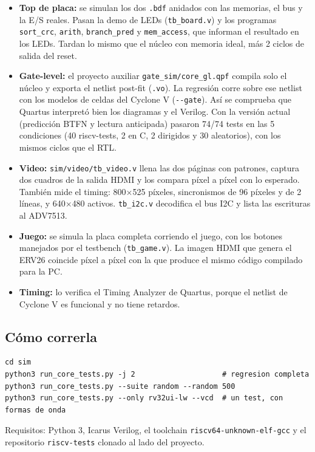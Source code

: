 \documentclass[11pt,a4paper]{article}
\newcommand{\code}[1]{\texttt{#1}}
\begin{document}
\begin{itemize}
\item \textbf{Top de placa:} se simulan los dos \code{.bdf} anidados con las memorias, el bus y la E/S reales. Pasan la demo de LEDs (\code{tb\_board.v}) y los programas \code{sort\_crc}, \code{arith}, \code{branch\_pred} y \code{mem\_access}, que informan el resultado en los LEDs. Tardan lo mismo que el núcleo con memoria ideal, más 2 ciclos de salida del reset.
\item \textbf{Gate-level:} el proyecto auxiliar \code{gate\_sim/core\_gl.qpf} compila solo el núcleo y exporta el netlist post-fit (\code{.vo}). La regresión corre sobre ese netlist con los modelos de celdas del Cyclone V (\lstinline{--gate}). Así se comprueba que Quartus interpretó bien los diagramas y el Verilog. Con la versión actual (predicción BTFN y lectura anticipada) pasaron 74/74 tests en las 5 condiciones (40 riscv-tests, 2 en C, 2 dirigidos y 30 aleatorios), con los mismos ciclos que el RTL.
\item \textbf{Video:} \code{sim/video/tb\_video.v} llena las dos páginas con patrones, captura dos cuadros de la salida HDMI y los compara píxel a píxel con lo esperado. También mide el timing: 800$\times$525 píxeles, sincronismos de 96 píxeles y de 2 líneas, y 640$\times$480 activos. \code{tb\_i2c.v} decodifica el bus I2C y lista las escrituras al ADV7513.
\item \textbf{Juego:} se simula la placa completa corriendo el juego, con los botones manejados por el testbench (\code{tb\_game.v}). La imagen HDMI que genera el ERV26 coincide píxel a píxel con la que produce el mismo código compilado para la PC.
\item \textbf{Timing:} lo verifica el Timing Analyzer de Quartus, porque el netlist de Cyclone V es funcional y no tiene retardos.
\end{itemize}

\subsection{Cómo correrla}

\begin{lstlisting}
cd sim
python3 run_core_tests.py -j 2                    # regresion completa
python3 run_core_tests.py --suite random --random 500
python3 run_core_tests.py --only rv32ui-lw --vcd  # un test, con formas de onda
\end{lstlisting}

{\sloppy Requisitos: Python 3, Icarus Verilog, el toolchain
\code{riscv64-unknown-elf-gcc} y el repositorio \code{riscv-tests} clonado al lado del proyecto.\par}
\end{document}
